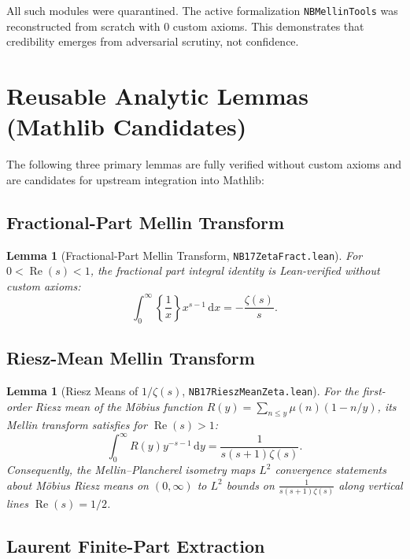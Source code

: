 \documentclass[11pt,a4paper]{article}
\theoremstyle{plain}
\newtheorem{lemma}[theorem]{Lemma}
\theoremstyle{definition}
\theoremstyle{remark}
\newcommand{\diff}{\mathrm{d}}
\DeclareMathOperator{\RePart}{Re}
\renewcommand{\Re}{\RePart}
\begin{document}
All such modules were quarantined. The active formalization \texttt{NBMellinTools} was reconstructed from scratch with 0 custom axioms. This demonstrates that credibility emerges from adversarial scrutiny, not confidence.

\section{Reusable Analytic Lemmas (Mathlib Candidates)}
\label{sec:lemmas}

The following three primary lemmas are fully verified without custom axioms and are candidates for upstream integration into Mathlib:

\subsection{Fractional-Part Mellin Transform}

\begin{lemma}[Fractional-Part Mellin Transform, \texttt{NB17ZetaFract.lean}]
For $0 < \Re(s) < 1$, the fractional part integral identity is Lean-verified without custom axioms:
\[
\int_{0}^{\infty} \left\{ \frac{1}{x} \right\} x^{s-1} \,\diff x = -\frac{\zeta(s)}{s}.
\]
\end{lemma}

\subsection{Riesz-Mean Mellin Transform}

\begin{lemma}[Riesz Means of $1/\zeta(s)$, \texttt{NB17RieszMeanZeta.lean}]
For the first-order Riesz mean of the M\"obius function $R(y) = \sum_{n \le y} \mu(n)(1 - n/y)$, its Mellin transform satisfies for $\Re(s) > 1$:
\[
\int_{0}^{\infty} R(y) y^{-s-1} \,\diff y = \frac{1}{s(s+1)\zeta(s)}.
\]
Consequently, the Mellin--Plancherel isometry maps $L^2$ convergence statements about M\"obius Riesz means on $(0,\infty)$ to $L^2$ bounds on $\frac{1}{s(s+1)\zeta(s)}$ along vertical lines $\Re(s) = 1/2$.
\end{lemma}

\subsection{Laurent Finite-Part Extraction}
\end{document}
